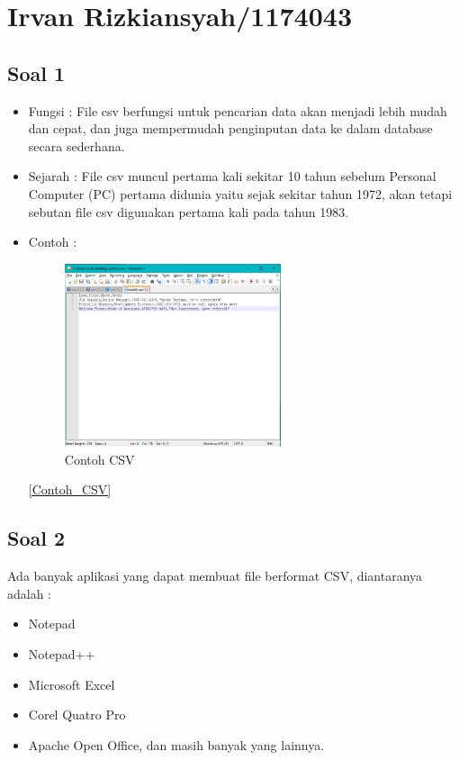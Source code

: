 \section{Irvan Rizkiansyah/1174043}
	\subsection{Soal 1}
		\begin{itemize}
			\item Fungsi : File csv berfungsi untuk pencarian data akan menjadi lebih mudah dan cepat, dan juga mempermudah penginputan data ke dalam database secara sederhana.
			\item Sejarah : File csv muncul pertama kali sekitar 10 tahun sebelum Personal Computer (PC) pertama  didunia yaitu sejak sekitar tahun 1972, akan tetapi sebutan file csv digunakan pertama kali pada tahun 1983.
			\item Contoh : 
				\begin{figure} [ht]
					\centerline{\includegraphics[width=0.6\textwidth]{figures/4/1174043/Teori/Contoh_CSV.png}}
					\caption{Contoh CSV}
					\label{Contoh CSV}
				\end{figure}

			\ref{Contoh_CSV}
		\end{itemize}
	
	\subsection{Soal 2}
	Ada banyak aplikasi yang dapat membuat file berformat CSV, diantaranya adalah :
		\begin{itemize}
			\item Notepad
			\item Notepad++
			\item Microsoft Excel
			\item Corel Quatro Pro
			\item Apache Open Office, dan masih banyak yang lainnya.
		\end{itemize}
		

